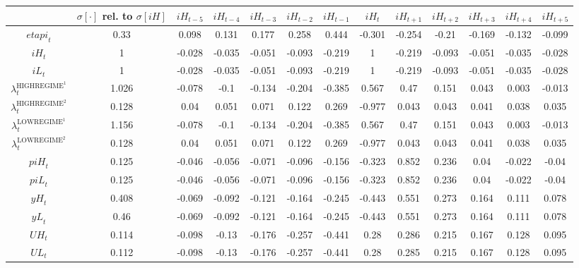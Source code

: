 \begin{tabular}{c|c|c|c|c|c|c|c|c|c|c|c|c|}
  & $\sigma[\cdot]$ rel. to $\sigma[{i\!H}]$ & ${i\!H}_{t-5}$ & ${i\!H}_{t-4}$ & ${i\!H}_{t-3}$ & ${i\!H}_{t-2}$ & ${i\!H}_{t-1}$ & ${i\!H}_{t}$ & ${i\!H}_{t+1}$ & ${i\!H}_{t+2}$ & ${i\!H}_{t+3}$ & ${i\!H}_{t+4}$ & ${i\!H}_{t+5}$\\
\hline
${e\!t\!a\!p\!i}_{t}$ & 0.33 & 0.098 & 0.131 & 0.177 & 0.258 & 0.444 & -0.301 & -0.254 & -0.21 & -0.169 & -0.132 & -0.099 \\
${i\!H}_{t}$ & 1 & -0.028 & -0.035 & -0.051 & -0.093 & -0.219 & 1 & -0.219 & -0.093 & -0.051 & -0.035 & -0.028 \\
${i\!L}_{t}$ & 1 & -0.028 & -0.035 & -0.051 & -0.093 & -0.219 & 1 & -0.219 & -0.093 & -0.051 & -0.035 & -0.028 \\
$\lambda^{\mathrm{HIGHREGIME}^{\mathrm{1}}}_{t}$ & 1.026 & -0.078 & -0.1 & -0.134 & -0.204 & -0.385 & 0.567 & 0.47 & 0.151 & 0.043 & 0.003 & -0.013 \\
$\lambda^{\mathrm{HIGHREGIME}^{\mathrm{2}}}_{t}$ & 0.128 & 0.04 & 0.051 & 0.071 & 0.122 & 0.269 & -0.977 & 0.043 & 0.043 & 0.041 & 0.038 & 0.035 \\
$\lambda^{\mathrm{LOWREGIME}^{\mathrm{1}}}_{t}$ & 1.156 & -0.078 & -0.1 & -0.134 & -0.204 & -0.385 & 0.567 & 0.47 & 0.151 & 0.043 & 0.003 & -0.013 \\
$\lambda^{\mathrm{LOWREGIME}^{\mathrm{2}}}_{t}$ & 0.128 & 0.04 & 0.051 & 0.071 & 0.122 & 0.269 & -0.977 & 0.043 & 0.043 & 0.041 & 0.038 & 0.035 \\
${p\!i\!H}_{t}$ & 0.125 & -0.046 & -0.056 & -0.071 & -0.096 & -0.156 & -0.323 & 0.852 & 0.236 & 0.04 & -0.022 & -0.04 \\
${p\!i\!L}_{t}$ & 0.125 & -0.046 & -0.056 & -0.071 & -0.096 & -0.156 & -0.323 & 0.852 & 0.236 & 0.04 & -0.022 & -0.04 \\
${y\!H}_{t}$ & 0.408 & -0.069 & -0.092 & -0.121 & -0.164 & -0.245 & -0.443 & 0.551 & 0.273 & 0.164 & 0.111 & 0.078 \\
${y\!L}_{t}$ & 0.46 & -0.069 & -0.092 & -0.121 & -0.164 & -0.245 & -0.443 & 0.551 & 0.273 & 0.164 & 0.111 & 0.078 \\
${U\!H}_{t}$ & 0.114 & -0.098 & -0.13 & -0.176 & -0.257 & -0.441 & 0.28 & 0.286 & 0.215 & 0.167 & 0.128 & 0.095 \\
${U\!L}_{t}$ & 0.112 & -0.098 & -0.13 & -0.176 & -0.257 & -0.441 & 0.28 & 0.285 & 0.215 & 0.167 & 0.128 & 0.095 \\
\hline
\end{tabular}


